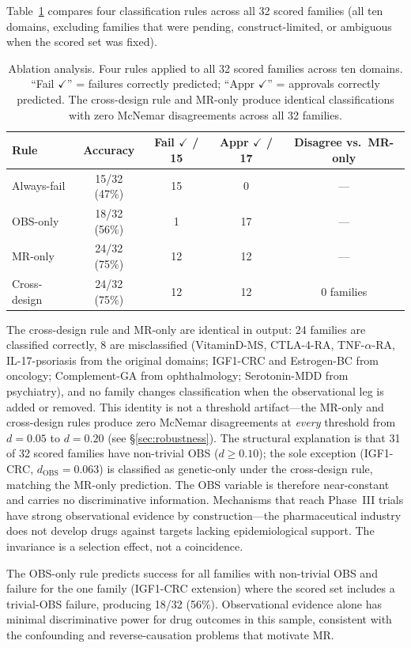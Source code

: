 \documentclass[11pt]{article}
\begin{document}
Table~\ref{tab:ablation} compares four classification rules across all 32 scored families (all ten domains, excluding families that were pending, construct-limited, or ambiguous when the scored set was fixed).

\begin{table}[t]
\centering
\caption{Ablation analysis. Four rules applied to all 32 scored families across ten domains. ``Fail $\checkmark$'' = failures correctly predicted; ``Appr $\checkmark$'' = approvals correctly predicted. The cross-design rule and MR-only produce identical classifications with zero McNemar disagreements across all 32 families.}
\label{tab:ablation}
\begin{tabular}{lcccc}
\toprule
Rule & Accuracy & Fail $\checkmark$ / 15 & Appr $\checkmark$ / 17 & Disagree vs.\ MR-only \\
\midrule
Always-fail & 15/32 (47\%) & 15 & 0 & --- \\
OBS-only & 18/32 (56\%) & 1 & 17 & --- \\
MR-only & 24/32 (75\%) & 12 & 12 & --- \\
Cross-design & 24/32 (75\%) & 12 & 12 & 0 families \\
\bottomrule
\end{tabular}
\end{table}

The cross-design rule and MR-only are identical in output: 24 families are classified correctly, 8 are misclassified (VitaminD-MS, CTLA-4-RA, TNF-$\alpha$-RA, IL-17-psoriasis from the original domains; IGF1-CRC and Estrogen-BC from oncology; Complement-GA from ophthalmology; Serotonin-MDD from psychiatry), and no family changes classification when the observational leg is added or removed. This identity is not a threshold artifact---the MR-only and cross-design rules produce zero McNemar disagreements at \emph{every} threshold from $d = 0.05$ to $d = 0.20$ (see \S\ref{sec:robustness}). The structural explanation is that 31 of 32 scored families have non-trivial OBS ($d \geq 0.10$); the sole exception (IGF1-CRC, $d_{\text{OBS}} = 0.063$) is classified as genetic-only under the cross-design rule, matching the MR-only prediction. The OBS variable is therefore near-constant and carries no discriminative information. Mechanisms that reach Phase~III trials have strong observational evidence by construction---the pharmaceutical industry does not develop drugs against targets lacking epidemiological support. The invariance is a selection effect, not a coincidence.

The OBS-only rule predicts success for all families with non-trivial OBS and failure for the one family (IGF1-CRC extension) where the scored set includes a trivial-OBS failure, producing 18/32 (56\%). Observational evidence alone has minimal discriminative power for drug outcomes in this sample, consistent with the confounding and reverse-causation problems that motivate MR.
\end{document}
